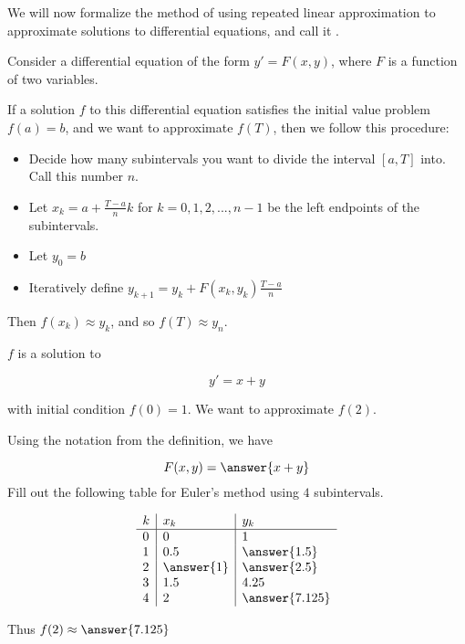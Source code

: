 \documentclass{ximera}
\begin{document}
We will now formalize the method of using repeated linear approximation to approximate solutions to differential equations, and call it .

\begin{definition}
Consider a differential equation of the form $y' = F(x,y)$, where $F$ is a function of two variables.

If a solution $f$  to this differential equation satisfies the initial value problem $f(a) = b$, and we want to approximate $f(T)$, then we follow this procedure:

\begin{itemize}
	\item Decide how many subintervals you want to divide the interval $[a,T]$ into.  Call this number $n$.
	\item Let $x_k = a+\frac{T-a}{n}k$ for $k=0,1,2,...,n-1$ be the left endpoints of the subintervals.
	\item Let $y_0 = b$
	\item Iteratively define $y_{k+1} = y_k+F(x_k,y_k)\frac{T-a}{n}$ 
\end{itemize}

Then $f(x_k) \approx y_k$, and so $f(T) \approx y_{n}$.

\end{definition}




\begin{question}
$f$ is a solution to 

\[
y'=x+y
\]

with initial condition $f(0)=1$.  We want to approximate $f(2)$.  

Using the notation from the definition, we have 

\[
F(x,y) = \answer{x+y}
\]
Fill out the following table for Euler's method using $4$ subintervals.

	\[
\begin{array}{l|l|l}
k & x_k & y_k \\ \hline
0 & 0   & 1 \\
1 & 0.5 & \answer{1.5} \\
2 & \answer{1} & \answer{2.5}  \\
3 & 1.5 & 4.25 \\
4 & 2 & \answer{7.125} \\
\end{array}
\]

	Thus $f(2) \approx \answer{7.125}$

\end{question}	
\end{document}

